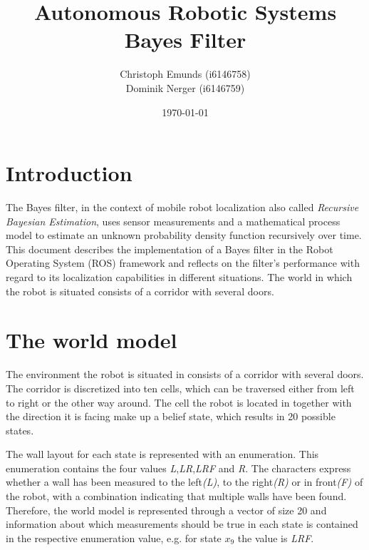 \documentclass[10pt,a4paper]{article}
\author{Christoph Emunds (i6146758)\\Dominik Nerger (i6146759)}
\title{Autonomous Robotic Systems\\Bayes Filter}
\date{\today}
\begin{document}
	\maketitle
	
	\tableofcontents
	
	\section{Introduction}
	The Bayes filter, in the context of mobile robot localization also called \textit{Recursive Bayesian Estimation}, uses sensor measurements and a mathematical process model to estimate an unknown probability density function recursively over time.	This document describes the implementation of a Bayes filter in the Robot Operating System (ROS) framework and reflects on the filter's performance with regard to its localization capabilities in different situations. The world in which the robot is situated consists of a corridor with several doors.
	
		
	\section{The world model}
	The environment the robot is situated in consists of a corridor with several doors. The corridor is discretized into ten cells, which can be traversed either from left to right or the other way around. The cell the robot is located in together with the direction it is facing make up a belief state, which results in 20 possible states.
	
	
	The wall layout for each state is represented with an enumeration. This enumeration contains the four values \textit{L},\textit{LR},\textit{LRF} and \textit{R}. The characters express whether a wall has been measured to the left\textit{(L)}, to the right\textit{(R)} or in front\textit{(F)} of the robot, with a combination indicating that multiple walls have been found. Therefore, the world model is represented through a vector of size 20 and information about which measurements should be true in each state is contained in the respective enumeration value, e.g. for state $x_9$ the value is \textit{LRF}.
	
\end{document}
